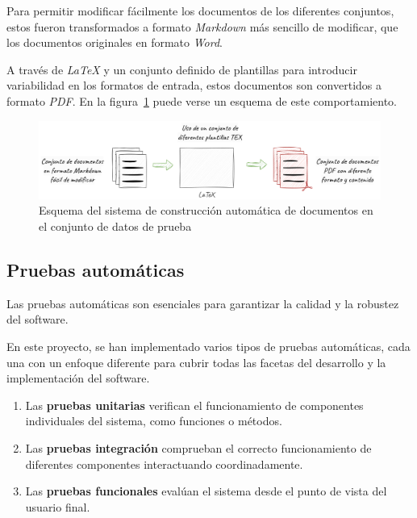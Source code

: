 Para permitir modificar fácilmente los documentos de los diferentes conjuntos, estos fueron transformados a formato
\textit{Markdown} más sencillo de modificar, que los documentos originales en formato \textit{Word}.

A través de \textit{LaTeX} y un conjunto definido de plantillas para introducir variabilidad en los formatos de
entrada, estos documentos son convertidos a formato \textit{PDF}.
En la figura~\ref{fig:chapter_4.5.dataset_construction_overview} puede verse un esquema de este comportamiento.

\begin{figure}[ht]
    \begin{center}
        \includegraphics[width=\textwidth]{./chapter/4/images/chapter_4.5.dataset_construction_overview}
        \caption{Esquema del sistema de construcción automática de documentos en el conjunto de datos de prueba}
        \label{fig:chapter_4.5.dataset_construction_overview}
    \end{center}
\end{figure}

\subsection*{Pruebas automáticas}

Las pruebas automáticas son esenciales para garantizar la calidad y la robustez del software.

En este proyecto, se han implementado varios tipos de pruebas automáticas, cada una con un enfoque diferente para cubrir
todas las facetas del desarrollo y la implementación del software.

\begin{enumerate}
    \item Las \textbf{pruebas unitarias} verifican el funcionamiento de componentes individuales del sistema, como
    funciones o métodos.
    \item Las \textbf{pruebas integración} comprueban el correcto funcionamiento de diferentes componentes
    interactuando coordinadamente.
    \item Las \textbf{pruebas funcionales} evalúan el sistema desde el punto de vista del usuario final.
\end{enumerate}

